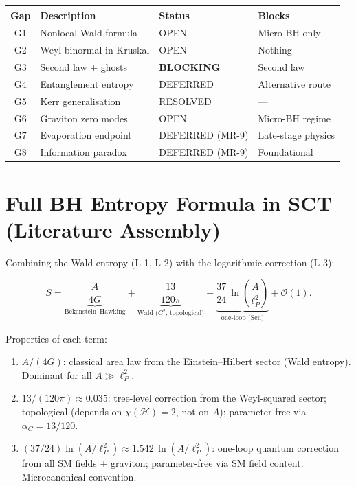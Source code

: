 \documentclass[12pt,a4paper]{article}
\theoremstyle{definition}
\theoremstyle{remark}
\begin{document}
\begin{center}
\begin{tabular}{clll}
\toprule
\textbf{Gap} & \textbf{Description} & \textbf{Status} & \textbf{Blocks} \\
\midrule
G1 & Nonlocal Wald formula & OPEN & Micro-BH only \\
G2 & Weyl binormal in Kruskal & OPEN & Nothing \\
G3 & Second law + ghosts & \textbf{BLOCKING} & Second law \\
G4 & Entanglement entropy & DEFERRED & Alternative route \\
G5 & Kerr generalisation & RESOLVED & --- \\
G6 & Graviton zero modes & OPEN & Micro-BH regime \\
G7 & Evaporation endpoint & DEFERRED (MR-9) & Late-stage physics \\
G8 & Information paradox & DEFERRED (MR-9) & Foundational \\
\bottomrule
\end{tabular}
\end{center}


\section{Full BH Entropy Formula in SCT (Literature Assembly)}
\label{sec:full-formula}

Combining the Wald entropy (L-1, L-2) with the logarithmic
correction (L-3):

\begin{tcolorbox}[colback=blue!5!white, colframe=blue!50!black,
  title={\textbf{MT-1 Main Formula (to be verified in derivation phase)}}]
\begin{equation}\label{eq:full-entropy}
  S = \underbrace{\frac{A}{4G}}_{\text{Bekenstein--Hawking}}
  + \underbrace{\frac{13}{120\pi}}_{\text{Wald ($C^2$, topological)}}
  + \underbrace{\frac{37}{24}\,
    \ln\!\left(\frac{A}{\ell_P^2}\right)}_{\text{one-loop (Sen)}}
  + \mathcal{O}(1).
\end{equation}
\end{tcolorbox}

\noindent
Properties of each term:
\begin{enumerate}[nosep]
\item \textbf{$A/(4G)$}: classical area law from the Einstein--Hilbert
  sector (Wald entropy).  Dominant for all $A \gg \ell_P^2$.
\item \textbf{$13/(120\pi) \approx 0.035$}: tree-level correction
  from the Weyl-squared sector; topological (depends on
  $\chi(\mathcal{H}) = 2$, not on $A$); parameter-free via
  $\alpha_C = 13/120$.
\item \textbf{$(37/24)\ln(A/\ell_P^2) \approx 1.542\,
  \ln(A/\ell_P^2)$}: one-loop quantum correction from all SM
  fields + graviton; parameter-free via SM field content.
  Microcanonical convention.
\end{enumerate}
\end{document}
